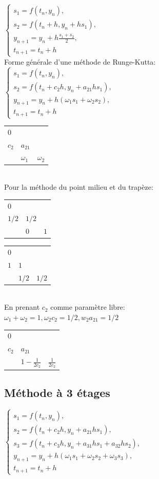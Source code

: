 \documentclass[a4paper,9pt]{extarticle}
\begin{document}
\begin{multicols*}{2}
$
\begin{cases}
s_1 = f(t_n,y_n),\\
s_2 = f \left(t_n + h, y_n + hs_1 \right),\\
y_{n+1} = y_n + h\frac{s_1+s_2}{2}, \\
t_{n+1} = t_n + h
\end{cases}
$\\
Forme générale d'une méthode de Runge-Kutta:\\
$
\begin{cases}
s_1 = f(t_n,y_n),\\
s_2 = f \left(t_n + c_2h, y_n + a_{21}hs_1 \right),\\
y_{n+1} = y_n + h(\omega_1s_1+\omega_2s_2), \\
t_{n+1} = t_n + h
\end{cases}
$
\begin{tabular}{l|ll}
$0$   &            &            \\
$c_2$ & $a_{21}$     &            \\ \hline
      & $\omega_1$ & $\omega_2$
\end{tabular}\\
Pour la méthode du point milieu et du trapèze:\\
\begin{tabular}{l|ll}
$0$   &       &     \\
$1/2$ & $1/2$ &     \\ \hline
      & $0$   & $1$
\end{tabular}
\begin{tabular}{l|ll}
$0$ &       &       \\
$1$ & $1$   &       \\ \hline
    & $1/2$ & $1/2$
\end{tabular}\\
En prenant $c_2$ comme paramètre libre:\\
$\omega_1+\omega_2 = 1, \omega_2c_2=1/2,w_2a_{21}=1/2$
\begin{tabular}{l|ll}
$0$   &                    &                  \\
$c_2$ & $a_21$             &                  \\ \hline
      & $1-\frac{1}{2c_2}$ & $\frac{1}{2c_2}$
\end{tabular}
\subsection{Méthode à 3 étages}
$
\begin{cases}
s_1 = f(t_n,y_n),\\
s_2 = f \left(t_n + c_2h, y_n + a_{21}hs_1 \right),\\
s_3 = f \left(t_n + c_3h, y_n + a_{31}hs_1 + a_{32}hs_2 \right),\\
y_{n+1} = y_n + h(\omega_1s_1+\omega_2s_2 + \omega_3s_3), \\
t_{n+1} = t_n + h
\end{cases}
$


\end{multicols*}
\end{document}
